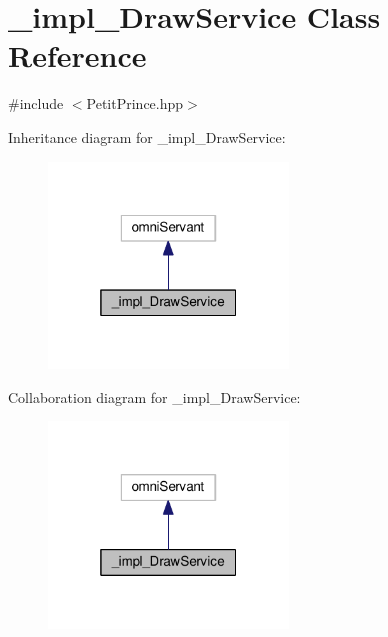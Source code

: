 \hypertarget{class__impl___draw_service}{}\section{\+\_\+impl\+\_\+\+Draw\+Service Class Reference}
\label{class__impl___draw_service}


{\ttfamily \#include $<$Petit\+Prince.\+hpp$>$}



Inheritance diagram for \+\_\+impl\+\_\+\+Draw\+Service\+:
\nopagebreak
\begin{figure}[H]
\begin{center}
\leavevmode
\includegraphics[width=181pt]{class__impl___draw_service__inherit__graph}
\end{center}
\end{figure}


Collaboration diagram for \+\_\+impl\+\_\+\+Draw\+Service\+:
\nopagebreak
\begin{figure}[H]
\begin{center}
\leavevmode
\includegraphics[width=181pt]{class__impl___draw_service__coll__graph}
\end{center}
\end{figure}
